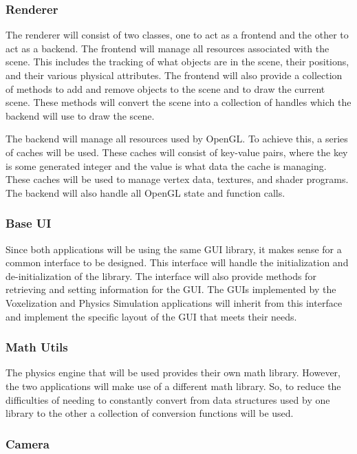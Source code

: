 \subsubsection{Renderer}

The renderer will consist of two classes, one to act as a frontend and the other to act as a
backend. The frontend will manage all resources associated with the scene. This includes the 
tracking of what objects are in the scene, their positions, and their various physical attributes.
The frontend will also provide a collection of methods to add and remove objects to the scene and to 
draw the current scene. These methods will convert the scene into a collection of handles which the
backend will use to draw the scene.

The backend will manage all resources used by OpenGL. To achieve this, a series of caches will be 
used. These caches will consist of key-value pairs, where the key is some generated integer and the
value is what data the cache is managing. These caches will be used to manage vertex data, textures,
and shader programs. The backend will also handle all OpenGL state and function calls.

\subsubsection{Base UI}

Since both applications will be using the same GUI library, it makes sense for a common interface
to be designed. This interface will handle the initialization and de-initialization of the library.
The interface will also provide methods for retrieving and setting information for the GUI. The
GUIs implemented by the Voxelization and Physics Simulation applications will inherit from this
interface and implement the specific layout of the GUI that meets their needs.

\subsubsection{Math Utils}

The physics engine that will be used provides their own math library. However, the two applications
will make use of a different math library. So, to reduce the difficulties of needing to constantly
convert from data structures used by one library to the other a collection of conversion functions
will be used. 

\subsubsection{Camera}

